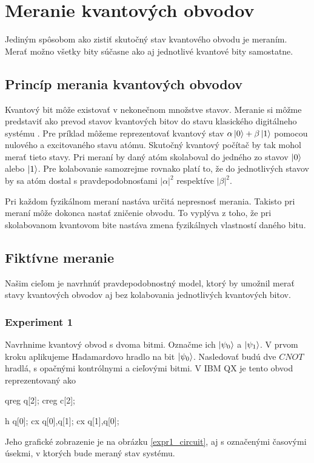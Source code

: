 
\chapter{Meranie kvantových obvodov}

Jediným spôsobom ako zistiť skutočný stav kvantového obvodu je meraním.
Merať možno všetky bity súčasne ako aj jednotlivé kvantové bity samostatne.

\section{Princíp merania kvantových obvodov}

Kvantový bit môže existovať v nekonečnom množstve stavov. Meranie si môžme 
predstaviť ako prevod stavov kvantových bitov do stavu klasického digitálneho
systému \cite{Nie10}. Pre príklad môžeme reprezentovať kvantový stav 
\(\alpha\ket{0} + \beta\ket{1}\) pomocou nulového a excitovaného stavu atómu.
Skutočný kvantový počítač by tak mohol merať tieto stavy. Pri meraní by 
daný atóm skolaboval do jedného zo stavov \(\ket{0}\) alebo \(\ket{1}\).
Pre kolabovanie samozrejme rovnako platí to, že do jednotlivých stavov by
sa atóm dostal s pravdepodobnosťami \(|\alpha|^2\) respektíve \(|\beta|^2\).


Pri každom fyzikálnom meraní nastáva určitá nepresnosť merania. Takisto 
pri meraní môže dokonca nastať zničenie obvodu. To vyplýva z toho, že pri
skolabovanom kvantovom bite nastáva zmena fyzikálnych vlastností daného bitu. 

\section{Fiktívne meranie}

Našim cieľom je navrhnúť pravdepodobnostný model, ktorý by umožnil merať
stavy kvantových obvodov aj bez kolabovania jednotlivých kvantových bitov.

\subsection{Experiment 1}
Navrhnime kvantový obvod s dvoma bitmi. Označme ich \(\ket{\psi_0}\) a 
\(\ket{\psi_1}\). V prvom kroku aplikujeme Hadamardovo hradlo na bit 
\(\ket{\psi_0}\). Nasledovať budú dve \(CNOT\) hradlá, s opačnými kontrólnymi 
a cieľovými bitmi. V IBM QX je tento obvod reprezentovaný ako 
\begin{code}
qreg q[2];
creg c[2];

h q[0];
cx q[0],q[1];
cx q[1],q[0];
\end{code}
Jeho grafické zobrazenie je na obrázku \ref{expr1_circuit}, aj s označenými
časovými úsekmi, v ktorých bude meraný stav systému. 

